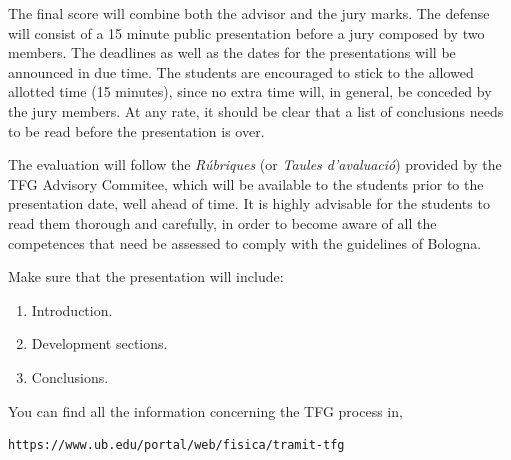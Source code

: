 \documentclass[twocolumn]{revtex4}
\begin{document}
The final score will combine both the
advisor and the jury marks.
The defense will consist of a 15 minute public presentation before
a jury composed by two members. The deadlines as well as the dates for the
presentations will be announced in due time.
The students are encouraged to stick to the allowed allotted time (15 minutes),
since no extra time will, in general, be conceded by the jury members.
At any rate,
it should be clear that a list of conclusions needs to be read
before the presentation is over.

The evaluation will follow the {\it R\'ubriques} (or {\it Taules
d'avaluaci\'o}) provided by the TFG Advisory Commitee,
which will be available to
the students prior to the presentation date, well ahead of time. It is
highly advisable for the students to read them thorough and carefully,
in order to become aware of all the competences that need be assessed
to comply with the guidelines of Bologna.

Make sure that the presentation will include:
\begin{enumerate}
\item Introduction.
\item Development sections.
\item Conclusions.
\end{enumerate}

You can find all the information concerning the TFG process in,
\begin{verbatim}
https://www.ub.edu/portal/web/fisica/tramit-tfg
\end{verbatim}

\end{document}
